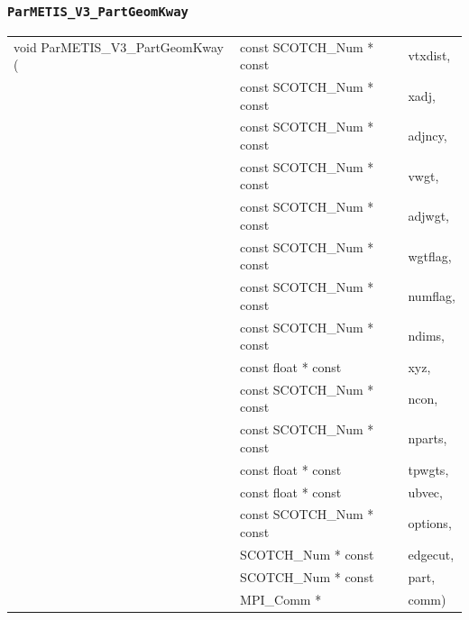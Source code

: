 \subsubsection{{\tt ParMETIS\_V3\_PartGeomKway}}

\begin{itemize}
\progsyn

{\tt\begin{tabular}{l@{}ll}
void ParMETIS\_V3\_PartGeomKway ( & const SCOTCH\_Num * const & vtxdist, \\
                                  & const SCOTCH\_Num * const & xadj, \\
                                  & const SCOTCH\_Num * const & adjncy, \\
                                  & const SCOTCH\_Num * const & vwgt, \\
                                  & const SCOTCH\_Num * const & adjwgt, \\
                                  & const SCOTCH\_Num * const & wgtflag, \\
                                  & const SCOTCH\_Num * const & numflag, \\
                                  & const SCOTCH\_Num * const & ndims, \\
                                  & const float * const       & xyz, \\
                                  & const SCOTCH\_Num * const & ncon, \\
                                  & const SCOTCH\_Num * const & nparts, \\
                                  & const float * const       & tpwgts, \\
                                  & const float * const       & ubvec, \\
                                  & const SCOTCH\_Num * const & options, \\
                                  & SCOTCH\_Num * const       & edgecut, \\
                                  & SCOTCH\_Num * const       & part, \\
                                  & MPI\_Comm *               & comm)
\end{tabular}}


\end{itemize}
